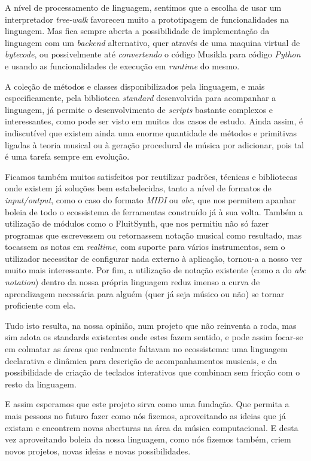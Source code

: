 A nível de processamento de linguagem, sentimos que a escolha de usar um interpretador \textit{tree-walk} favoreceu muito a prototipagem de funcionalidades na linguagem. Mas fica sempre aberta a possibilidade de implementação da linguagem com um \textit{backend} alternativo, quer através de uma maquina virtual de \textit{bytecode}, ou possivelmente até \textit{convertendo} o código Musikla para código \textit{Python} e usando as funcionalidades de execução em \textit{runtime} do mesmo.

A coleção de métodos e classes disponibilizados pela linguagem, e mais especificamente, pela biblioteca \textit{standard} desenvolvida para acompanhar a linguagem, já permite o desenvolvimento de \textit{scripts} bastante complexos e interessantes, como pode ser visto em muitos dos casos de estudo. Ainda assim, é indiscutível que existem ainda uma enorme quantidade de métodos e primitivas ligadas à teoria musical ou à geração procedural de música por adicionar, pois tal é uma tarefa sempre em evolução.

Ficamos também muitos satisfeitos por reutilizar padrões, técnicas e bibliotecas onde existem já soluções bem estabelecidas, tanto a nível de formatos de \textit{input/output}, como o caso do formato \textit{MIDI} ou \textit{abc}, que nos permitem apanhar boleia de todo o ecossistema de ferramentas construído já à sua volta. Também a utilização de módulos como o FluitSynth, que nos permitiu não só fazer programas que escrevessem ou retornassem notação musical como resultado, mas tocassem as notas em \textit{realtime}, com suporte para vários instrumentos, sem o utilizador necessitar de configurar nada externo à aplicação, tornou-a a nosso ver muito mais interessante. Por fim, a utilização de notação existente (como a do \textit{abc notation}) dentro da nossa própria linguagem reduz imenso a curva de aprendizagem necessária para alguém (quer já seja músico ou não) se tornar proficiente com ela.

Tudo isto resulta, na nossa opinião, num projeto que não reinventa a roda, mas sim adota os standards existentes onde estes fazem sentido, e pode assim focar-se em colmatar as áreas que realmente faltavam no ecossistema: uma linguagem declarativa e dinâmica para descrição de acompanhamentos musicais, e da possibilidade de criação de teclados interativos que combinam sem fricção com o resto da linguagem. 

E assim esperamos que este projeto sirva como uma fundação. Que permita a mais pessoas no futuro fazer como nós fizemos, aproveitando as ideias que já existam e encontrem novas aberturas na área da música computacional. E desta vez aproveitando boleia da nossa linguagem, como nós fizemos também, criem novos projetos, novas ideias e novas possibilidades.

